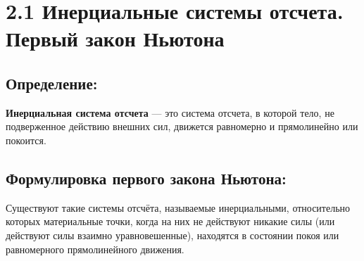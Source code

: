 \documentclass[a4paper, 12pt]{article}
\begin{document}





\section*{2.1 Инерциальные системы отсчета. Первый закон Ньютона}

\vspace{-9pt}
\subsection*{Определение:}
\vspace{-3pt}
\textbf{Инерциальная система отсчета} --- это система отсчета, в которой тело, не подверженное действию внешних сил, движется равномерно и прямолинейно или покоится.

\vspace{-9pt}
\subsection*{Формулировка первого закона Ньютона:}
\vspace{-3pt}
Существуют такие системы отсчёта, называемые инерциальными, относительно которых материальные точки, когда на них не действуют никакие силы (или действуют силы взаимно уравновешенные), находятся в состоянии покоя или равномерного прямолинейного движения.
\end{document}
